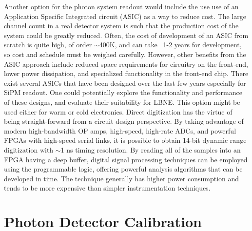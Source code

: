 Another option for the photon system readout would include the use use
of an Application Specific Integrated circuit (ASIC) as a way to
reduce cost.  The large channel count in a real detector system is
such that the production cost of the system could be greatly reduced.
Often, the cost of development of an ASIC from scratch is quite high,
of order $\sim$400K, and can take ~1-2 years for development, so cost
and schedule must be weighed carefully.  However, other benefits from
the ASIC approach include reduced space requirements for circuitry on
the front-end, lower power dissipation, and specialized functionality
in the front-end chip.  There exist several ASICs that have been
designed over the last few years especially for SiPM readout.  One
could potentially explore the functionality and performance of these
designs, and evaluate their suitability for LBNE.  This option might
be used either for warm or cold electronics.  Direct digitization has
the virtue of being straight-forward from a circuit design
perspective.  By taking advantage of modern high-bandwidth OP amps,
high-speed, high-rate ADCs, and powerful FPGAs with high-speed serial
links, it is possible to obtain 14-bit dynamic range digitization with
$\sim$1 ns timing resolution.  By reading all of the samples into an
FPGA having a deep buffer, digital signal processing techniques can be
employed using the programmable logic, offering powerful analysis
algorithms that can be developed in time.  The technique generally has
higher power consumption and tends to be more expensive than simpler
instrumentation techniques.

\section{Photon Detector Calibration}
\label{sec_pd_calib}


